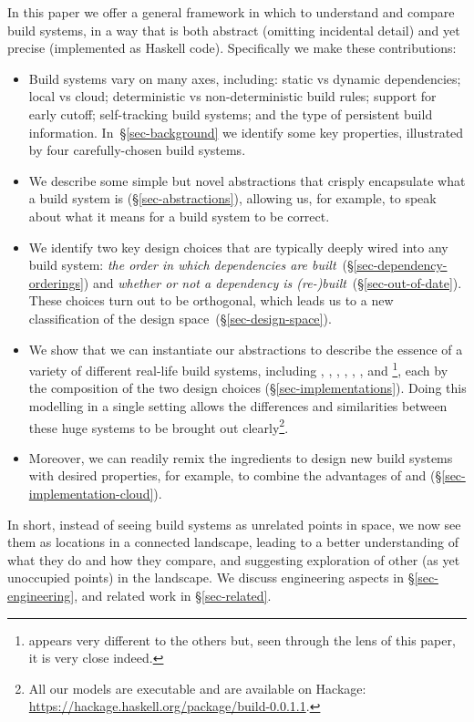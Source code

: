 In this paper we offer a general framework in which to understand and compare
build systems, in a way that is both abstract (omitting incidental detail)
and yet precise (implemented as Haskell code). Specifically we make these
contributions:
\begin{itemize}
\item Build systems vary on many axes, including: static vs dynamic
  dependencies; local vs cloud; deterministic vs non-deterministic build rules;
  support for early cutoff; self-tracking build systems; and the type of
  persistent build information. In~\S\ref{sec-background} we identify some key
  properties, illustrated by four carefully-chosen build systems.

\item We describe some simple but novel abstractions that
  crisply encapsulate what a build system is (\S\ref{sec-abstractions}),
  allowing us, for example, to speak about what it means for a build system to be correct.

\item We identify two key design choices that are typically deeply wired into
  any build system: \emph{the order in which dependencies are
  built}~(\S\ref{sec-dependency-orderings}) and \emph{whether or not a
  dependency is (re-)built}~(\S\ref{sec-out-of-date}). These choices turn out to
  be orthogonal, which leads us to a new classification of the design
  space~(\S\ref{sec-design-space}).

\item We show that we can instantiate our abstractions to describe the essence
of a variety of different real-life build systems, including \Make, \Shake,
\Bazel, \CloudBuild, \Buck, \Nix, and \Excel\footnote{\Excel appears very
different to the others but, seen through the lens of this paper, it is very
close indeed.}, each by the composition of the two design choices
(\S\ref{sec-implementations}). Doing this modelling in a single setting
allows the differences and similarities between these huge systems to be
brought out clearly\footnote{All our models are executable and are available on
Hackage: \url{https://hackage.haskell.org/package/build-0.0.1.1}.}.

\item Moreover, we can readily remix the ingredients to design new build systems
with desired properties, for example, to combine the advantages of \Shake and
\Bazel (\S\ref{sec-implementation-cloud}).

\end{itemize}
In short, instead of seeing build systems as unrelated
points in space, we now see them as locations in a connected landscape,
leading to a better understanding of what they do and how they compare,
and suggesting exploration of other (as yet unoccupied points) in the
landscape.
We discuss engineering aspects in \S\ref{sec-engineering}, and related
work in \S\ref{sec-related}.

